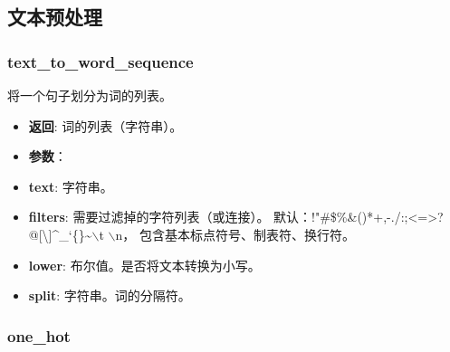 \subsection{文本预处理}
\subsubsection{text\_to\_word\_sequence}\label{textux5ftoux5fwordux5fsequence}

\begin{Shaded}
\begin{Highlighting}[]
\hspace{4cm}\OperatorTok{=}\StringTok{'!"#$\%\&()*+,-./:;<=>?@[}\CharTok{\textbackslash{}\textbackslash{}}\StringTok{]^_`\{|\}~}\NormalTok{,}
\hspace{4cm}\OperatorTok{=}\NormalTok{,}
\hspace{4cm}\OperatorTok{=}\NormalTok{)}
\end{Highlighting}
\end{Shaded}

将一个句子划分为词的列表。

\begin{itemize}
\item
  \textbf{返回}: 词的列表（字符串）。
\item
  \textbf{参数}：
\item
  \textbf{text}: 字符串。
\item
  \textbf{filters}: 需要过滤掉的字符列表（或连接）。
  默认：!"\#\$\%\&()*+,-./:;\textless{}=\textgreater{}?@{[}\textbackslash{}{]}\^{}\_`\{\textbar{}\}\textasciitilde{}$\backslash$t $\backslash$n，
  包含基本标点符号、制表符、换行符。
\item
  \textbf{lower}: 布尔值。是否将文本转换为小写。
\item
  \textbf{split}: 字符串。词的分隔符。
\end{itemize}

\subsubsection{one\_hot}\label{oneux5fhot}

\begin{Shaded}
\begin{Highlighting}[]
                                 \OperatorTok{=}\StringTok{'!"#$\%&()*+,-./:;<=>?@[}\CharTok{\textbackslash{}\textbackslash{}}\StringTok{]^_`\{|\}~}\NormalTok{,}
                                 \OperatorTok{=}\NormalTok{,}
                                 \OperatorTok{=}\NormalTok{)}
\end{Highlighting}
\end{Shaded}

